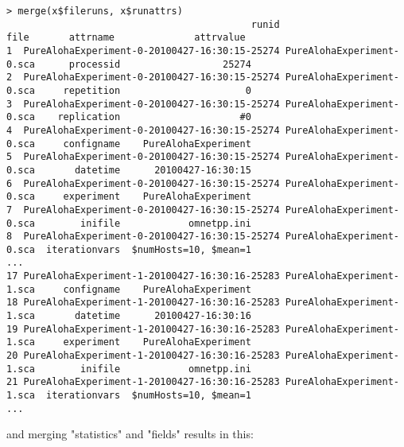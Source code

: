 \begin{verbatim}
> merge(x$fileruns, x$runattrs)
                                           runid                      file       attrname              attrvalue
1  PureAlohaExperiment-0-20100427-16:30:15-25274 PureAlohaExperiment-0.sca      processid                  25274
2  PureAlohaExperiment-0-20100427-16:30:15-25274 PureAlohaExperiment-0.sca     repetition                      0
3  PureAlohaExperiment-0-20100427-16:30:15-25274 PureAlohaExperiment-0.sca    replication                     #0
4  PureAlohaExperiment-0-20100427-16:30:15-25274 PureAlohaExperiment-0.sca     configname    PureAlohaExperiment
5  PureAlohaExperiment-0-20100427-16:30:15-25274 PureAlohaExperiment-0.sca       datetime      20100427-16:30:15
6  PureAlohaExperiment-0-20100427-16:30:15-25274 PureAlohaExperiment-0.sca     experiment    PureAlohaExperiment
7  PureAlohaExperiment-0-20100427-16:30:15-25274 PureAlohaExperiment-0.sca        inifile            omnetpp.ini
8  PureAlohaExperiment-0-20100427-16:30:15-25274 PureAlohaExperiment-0.sca  iterationvars  $numHosts=10, $mean=1
...
17 PureAlohaExperiment-1-20100427-16:30:16-25283 PureAlohaExperiment-1.sca     configname    PureAlohaExperiment
18 PureAlohaExperiment-1-20100427-16:30:16-25283 PureAlohaExperiment-1.sca       datetime      20100427-16:30:16
19 PureAlohaExperiment-1-20100427-16:30:16-25283 PureAlohaExperiment-1.sca     experiment    PureAlohaExperiment
20 PureAlohaExperiment-1-20100427-16:30:16-25283 PureAlohaExperiment-1.sca        inifile            omnetpp.ini
21 PureAlohaExperiment-1-20100427-16:30:16-25283 PureAlohaExperiment-1.sca  iterationvars  $numHosts=10, $mean=1
...
\end{verbatim}

and merging "statistics" and "fields" results in this:

